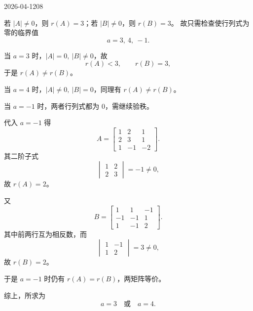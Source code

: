 \begin{mistake}{2026-04-12}{08}
\begin{solutioncontent}
若 \(|A|\ne 0\)，则 \(r(A)=3\)；若 \(|B|\ne 0\)，则 \(r(B)=3\)。
故只需检查使行列式为零的临界值
\[
a=3,\ 4,\ -1.
\]

当 \(a=3\) 时，\(|A|=0,\ |B|\ne 0\)，故
\[
r(A)<3,
\qquad
r(B)=3,
\]
于是 \(r(A)\ne r(B)\)。

当 \(a=4\) 时，\(|A|\ne 0,\ |B|=0\)，同理有 \(r(A)\ne r(B)\)。

当 \(a=-1\) 时，两者行列式都为 0，需继续验秩。

代入 \(a=-1\) 得
\[
A=\begin{bmatrix}
1&2&1\\
2&3&1\\
1&-1&-2
\end{bmatrix}.
\]
其二阶子式
\[
\begin{vmatrix}
1&2\\
2&3
\end{vmatrix}=-1\ne 0,
\]
故 \(r(A)=2\)。

又
\[
B=\begin{bmatrix}
1&1&-1\\
-1&-1&1\\
1&-1&2
\end{bmatrix}.
\]
其中前两行互为相反数，而
\[
\begin{vmatrix}
1&-1\\
1&2
\end{vmatrix}=3\ne 0,
\]
故 \(r(B)=2\)。

于是 \(a=-1\) 时仍有 \(r(A)=r(B)\)，两矩阵等价。

综上，所求为
\[
a=3\quad \text{或}\quad a=4.
\]

\end{solutioncontent}


\end{mistake}
